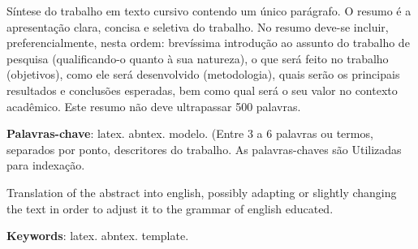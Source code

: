 %
%

\begin{resumo}
Síntese do trabalho em texto cursivo contendo um único parágrafo. O resumo é a apresentação clara, concisa e seletiva do trabalho.
No resumo deve-se incluir, preferencialmente, nesta ordem: brevíssima introdução ao assunto do trabalho de pesquisa (qualificando-o quanto à sua natureza), o que será feito no trabalho (objetivos), como ele será desenvolvido (metodologia), quais serão os principais resultados e conclusões esperadas, bem como qual será o seu valor no contexto acadêmico. Este resumo não deve ultrapassar 500 palavras.

\textbf{Palavras-chave}: latex. abntex. modelo.
(Entre 3 a 6 palavras ou termos, separados por ponto, descritores do trabalho. As palavras-chaves são Utilizadas para indexação.
\end{resumo}



\begin{resumo}[Abstract]
Translation of the abstract into english, possibly adapting or slightly changing the text in order to adjust it to the grammar of english educated.

\textbf{Keywords}: latex. abntex. template.
\end{resumo}
